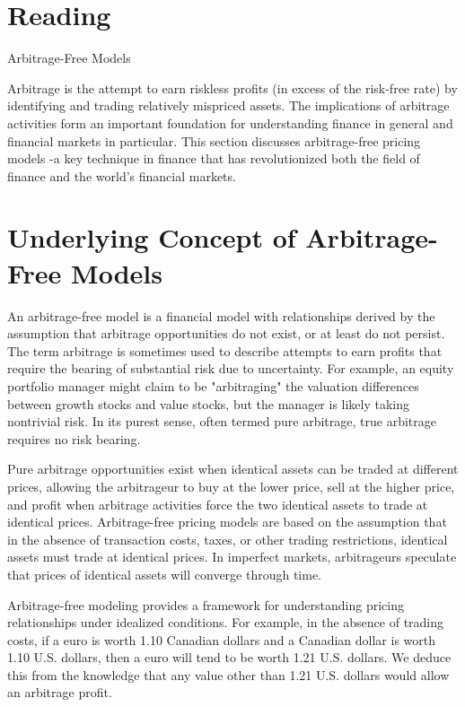 \documentclass[11pt]{article}
\begin{document}
\section*{Reading}
Arbitrage-Free Models

Arbitrage is the attempt to earn riskless profits (in excess of the risk-free rate) by identifying and trading relatively mispriced assets. The implications of arbitrage activities form an important foundation for understanding finance in general and financial markets in particular. This section discusses arbitrage-free pricing models -a key technique in finance that has revolutionized both the field of finance and the world's financial markets.

\section*{Underlying Concept of Arbitrage-Free Models}
An arbitrage-free model is a financial model with relationships derived by the assumption that arbitrage opportunities do not exist, or at least do not persist. The term arbitrage is sometimes used to describe attempts to earn profits that require the bearing of substantial risk due to uncertainty. For example, an equity portfolio manager might claim to be "arbitraging" the valuation differences between growth stocks and value stocks, but the manager is likely taking nontrivial risk. In its purest sense, often termed pure arbitrage, true arbitrage requires no risk bearing.

Pure arbitrage opportunities exist when identical assets can be traded at different prices, allowing the arbitrageur to buy at the lower price, sell at the higher price, and profit when arbitrage activities force the two identical assets to trade at identical prices. Arbitrage-free pricing models are based on the assumption that in the absence of transaction costs, taxes, or other trading restrictions, identical assets must trade at identical prices. In imperfect markets, arbitrageurs speculate that prices of identical assets will converge through time.

Arbitrage-free modeling provides a framework for understanding pricing relationships under idealized conditions. For example, in the absence of trading costs, if a euro is worth 1.10 Canadian dollars and a Canadian dollar is worth 1.10 U.S. dollars, then a euro will tend to be worth 1.21 U.S. dollars. We deduce this from the knowledge that any value other than 1.21 U.S. dollars would allow an arbitrage profit.
\end{document}
